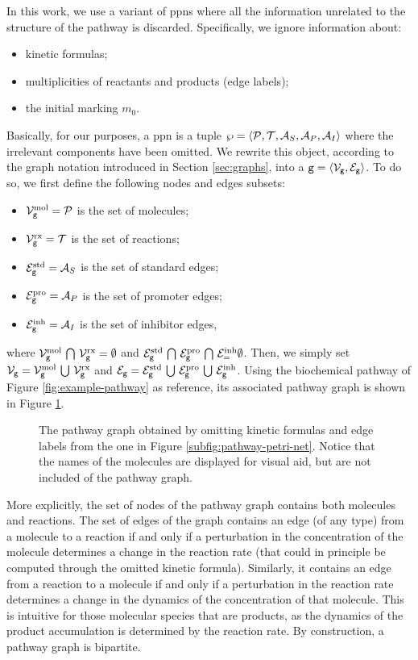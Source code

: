 In this work, we use a variant of \glspl{ppn} where all the information unrelated to the structure of the pathway is discarded. Specifically, we ignore information about:
\begin{itemize}
    \item kinetic formulas;
    \item multiplicities of reactants and products (\ie edge labels);
    \item the initial marking $m_0$.
\end{itemize}
Basically, for our purposes, a \gls{ppn} is a tuple $\wp = \Tuple{\Cal{P},\Cal{T},\Cal{A}_{S}, \Cal{A}_{P},\Cal{A}_{I}}$ where the irrelevant components have been omitted. We rewrite this object, according to the graph notation introduced in Section \ref{sec:graphs}, into a  $\Graph{g} = \Tuple{\Nodes{g}, \Edges{g}}$. To do so, we first define the following nodes and edges subsets:
\begin{itemize}
    \item $\MolNodes{g} = \Cal{P}$ is the set of molecules;
    \item $\RxNodes{g} = \Cal{T}$ is the set of reactions;
    \item $\StdEdges{g} = \Cal{A}_S$ is the set of standard edges;
    \item $\ProEdges{g} = \Cal{A}_P$ is the set of promoter edges;
    \item $\InhEdges{g} = \Cal{A}_I$ is the set of inhibitor edges,
\end{itemize}
where $\MolNodes{g} \Inter \RxNodes{g} = \emptyset$ and $\StdEdges{g} \Inter \ProEdges{g} \Inter \InhEdges = \emptyset$. Then, we simply set $\Nodes{g} = \MolNodes{g} \Union \RxNodes{g}$ and $\Edges{g} = \StdEdges{g} \Union \ProEdges{g} \Union \InhEdges{g}$.
Using the biochemical pathway of Figure \ref{fig:example-pathway} as reference, its associated pathway graph is shown in Figure \ref{fig:pathway-graph}.
\begin{figure}[h!]
    \centering
    \resizebox{.6\textwidth}{!}{}
    \caption{The pathway graph obtained by omitting kinetic formulas and edge labels from the one in Figure \ref{subfig:pathway-petri-net}. Notice that the names of the molecules are displayed for visual aid, but are not included of the pathway graph.}
    \label{fig:pathway-graph}
\end{figure}
More explicitly, the set of nodes of the pathway graph contains both molecules and reactions. The set of edges of the graph contains an edge (of any type) from a molecule to a reaction if and only if a perturbation in the concentration of the molecule determines a change in the reaction rate (that could in principle be computed through the omitted kinetic formula). Similarly, it contains an edge from a reaction to a molecule if and only if a perturbation in the reaction rate determines a change in the dynamics of the concentration of that molecule. This is intuitive for those molecular species that are products, as the dynamics of the product accumulation is determined by the reaction rate. By construction, a pathway graph is bipartite.

